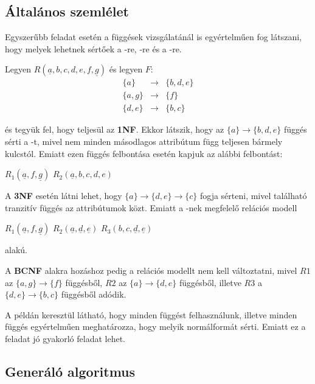 \subsection{Általános szemlélet}
Egyszerűbb feladat esetén a függések vizsgálatánál is egyértelműen fog látszani, hogy melyek lehetnek sértőek a \nfk-re, \nfh-re és a \BCNF-re. \par
\begin{pld}
    Legyen $R(\underline{a},b,c,d,e,f,\underline{g})$ és legyen $F$:
    $$
    \begin{matrix}
    \{a\} & \longrightarrow & \{b,d,e\}\\
    \{a,g\} & \longrightarrow &  \{f\} \\
    \{d,e\}  & \longrightarrow & \{b,c\}
    \end{matrix}
    $$
    
\noindent és tegyük fel, hogy teljesül az \textbf{1NF}. Ekkor látszik, hogy az $\{a\} \rightarrow \{b,d,e\}$ függés sérti a \nfk-t, mivel nem minden másodlagos attribútum függ teljesen bármely kulcstól. Emiatt ezen függés felbontása esetén kapjuk az alábbi felbontást:
    \begin{center}
        $R_1(\underline{a},f,\underline{g})$ \break
        $R_2(\underline{a},b,c,d,e)$
    \end{center}
    A \textbf{3NF} esetén látni lehet, hogy $\{a\} \rightarrow \{d,e\} \rightarrow \{c\}$ fogja sérteni, mivel található tranzitív függés az attribútumok közt. Emiatt a \nfh-nek megfelelő relációs modell
    \begin{center}
        $R_1(\underline{a},f,\underline{g})$ \break
        $R_2(\underline{a},\underline{d},\underline{e})$ \break
        $R_3(b,c,\underline{d},\underline{e})$
    \end{center}
    alakú. \par
    A \textbf{BCNF} alakra hozáshoz pedig a relációs modellt nem kell változtatni, mivel $R1$ az $\{a,g\} \rightarrow \{f\}$ függésből, $R2$ az $\{a\} \rightarrow \{d,e\}$ függésből, illetve $R3$ a $\{d,e\} \rightarrow \{b,c\}$ függésből adódik.
\end{pld}
A példán keresztül látható, hogy minden függést felhasználunk, illetve minden függés egyértelműen meghatározza, hogy melyik normálformát sérti. Emiatt ez a feladat jó gyakorló feladat lehet.

\subsection{Generáló algoritmus}

